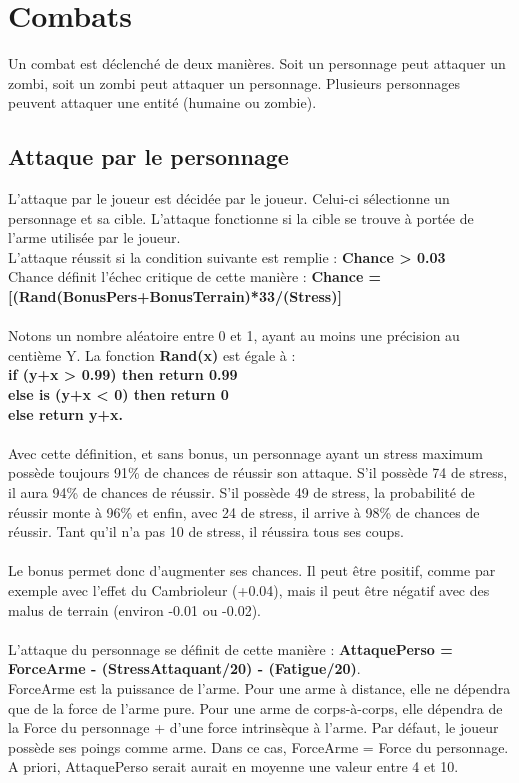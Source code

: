 \section{Combats}
Un combat est déclenché de deux manières. Soit un personnage peut attaquer un zombi, soit un zombi peut attaquer un personnage. Plusieurs personnages peuvent attaquer une entité (humaine ou zombie).
\subsection{Attaque par le personnage}
L'attaque par le joueur est décidée par le joueur. Celui-ci sélectionne un personnage et sa cible. L'attaque fonctionne si la cible se trouve à portée de l'arme utilisée par le joueur.\\
L'attaque réussit si la condition suivante est remplie : \textbf{Chance > 0.03}\\
Chance définit l'échec critique de cette manière : \textbf{Chance = [(Rand(BonusPers+BonusTerrain)*33/(Stress)]}
\\\\
Notons un nombre aléatoire entre 0 et 1, ayant au moins une précision au centième Y. La fonction \textbf{Rand(x)} est égale à :\\
\textbf{if (y+x > 0.99) then return 0.99\\
else is (y+x < 0) then return 0\\
else return y+x.}
\\\\
Avec cette définition, et sans bonus, un personnage ayant un stress maximum possède toujours 91\% de chances de réussir son attaque. S'il possède 74 de stress, il aura 94\% de chances de réussir. S'il possède 49 de stress, la probabilité de réussir monte à 96\% et enfin, avec 24 de stress, il arrive à 98\% de chances de réussir. Tant qu'il n'a pas 10 de stress, il réussira tous ses coups.
\\\\
Le bonus permet donc d'augmenter ses chances. Il peut être positif, comme par exemple avec l'effet du Cambrioleur (+0.04), mais il peut être négatif avec des malus de terrain (environ -0.01 ou -0.02).
\\\\
L'attaque du personnage se définit de cette manière : \textbf{AttaquePerso = ForceArme - (StressAttaquant/20) - (Fatigue/20)}.\\
ForceArme est la puissance de l'arme. Pour une arme à distance, elle ne dépendra que de la force de l'arme pure. Pour une arme de corps-à-corps, elle dépendra de la Force du personnage + d'une force intrinsèque à l'arme. Par défaut, le joueur possède ses poings comme arme. Dans ce cas, ForceArme = Force du personnage. A priori, AttaquePerso serait aurait en moyenne une valeur entre 4 et 10.

